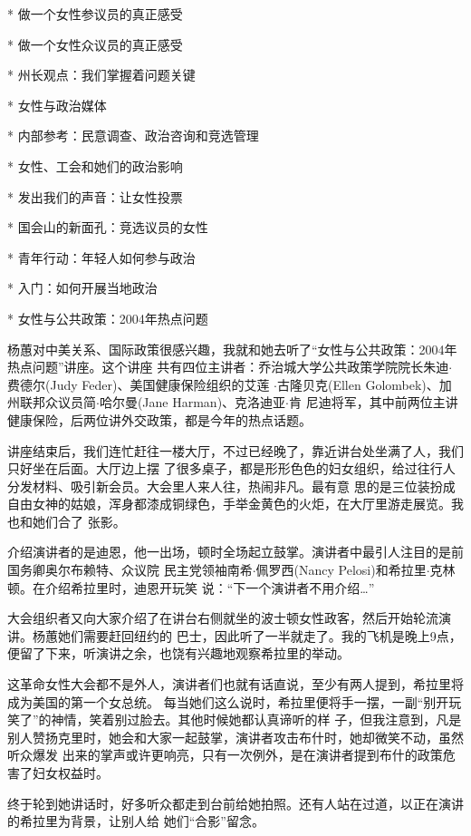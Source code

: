﻿\documentclass[11pt]{article}
\begin{document}
* 做一个女性参议员的真正感受

* 做一个女性众议员的真正感受

* 州长观点：我们掌握着问题关键

* 女性与政治媒体

* 内部参考：民意调查、政治咨询和竞选管理

* 女性、工会和她们的政治影响

* 发出我们的声音：让女性投票

* 国会山的新面孔：竞选议员的女性

* 青年行动：年轻人如何参与政治

* 入门：如何开展当地政治

* 女性与公共政策：2004年热点问题

杨蕙对中美关系、国际政策很感兴趣，我就和她去听了``女性与公共政策：2004年热点问题''讲座。这个讲座
共有四位主讲者：乔治城大学公共政策学院院长朱迪$\cdot$费德尔(Judy Feder)、美国健康保险组织的艾莲
$\cdot$古隆贝克(Ellen Golombek)、加州联邦众议员简$\cdot$哈尔曼(Jane Harman)、克洛迪亚$\cdot$肯
尼迪将军，其中前两位主讲健康保险，后两位讲外交政策，都是今年的热点话题。

讲座结束后，我们连忙赶往一楼大厅，不过已经晚了，靠近讲台处坐满了人，我们只好坐在后面。大厅边上摆
了很多桌子，都是形形色色的妇女组织，给过往行人分发材料、吸引新会员。大会里人来人往，热闹非凡。最有意
思的是三位装扮成自由女神的姑娘，浑身都漆成铜绿色，手举金黄色的火炬，在大厅里游走展览。我也和她们合了
张影。

介绍演讲者的是迪恩，他一出场，顿时全场起立鼓掌。演讲者中最引人注目的是前国务卿奥尔布赖特、众议院
民主党领袖南希$\cdot$佩罗西(Nancy Pelosi)和希拉里$\cdot$克林顿。在介绍希拉里时，迪恩开玩笑
说：``下一个演讲者不用介绍\ldots ''

大会组织者又向大家介绍了在讲台右侧就坐的波士顿女性政客，然后开始轮流演讲。杨蕙她们需要赶回纽约的
巴士，因此听了一半就走了。我的飞机是晚上9点，便留了下来，听演讲之余，也饶有兴趣地观察希拉里的举动。

这革命女性大会都不是外人，演讲者们也就有话直说，至少有两人提到，希拉里将成为美国的第一个女总统。
每当她们这么说时，希拉里便将手一摆，一副``别开玩笑了''的神情，笑着别过脸去。其他时候她都认真谛听的样
子，但我注意到，凡是别人赞扬克里时，她会和大家一起鼓掌，演讲者攻击布什时，她却微笑不动，虽然听众爆发
出来的掌声或许更响亮，只有一次例外，是在演讲者提到布什的政策危害了妇女权益时。

终于轮到她讲话时，好多听众都走到台前给她拍照。还有人站在过道，以正在演讲的希拉里为背景，让别人给
她们``合影''留念。
\end{document}
